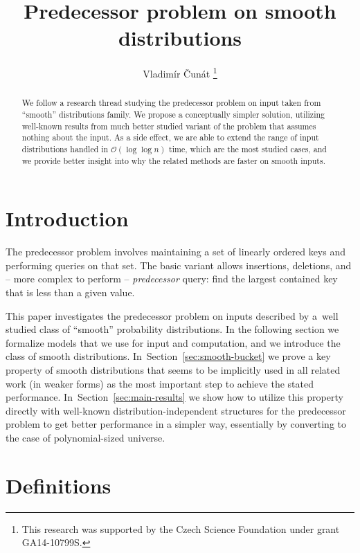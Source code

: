 \documentclass[
submission
]{dmtcs-episciences}
\title{Predecessor problem on smooth distributions}
\affiliation{
  Faculty of Mathematics and Physics, Charles University in Prague, Czech Republic \\
  CZ.NIC, z.\,s.\,p.\,o.
}
\author{Vladim\'ir \v{C}un\'at\affiliationmark{1,2}%
  \thanks{This research was supported by the Czech Science Foundation under grant GA14-10799S.}
}
\theoremstyle{plain}
\theoremstyle{definition}
\theoremstyle{remark}
\theoremstyle{plain}
\theoremstyle{plain}
\def\OO{\mathcal O}
\begin{document}
\maketitle

\begin{abstract}
We follow a research thread studying the predecessor problem on input
taken from ``smooth'' distributions family. We propose a conceptually
simpler solution, utilizing well-known results from much better studied
variant of the problem that assumes nothing about the input. As a
side effect, we are able to extend the range of input distributions
handled in $\OO\left(\log\log n\right)$ time, which are the most
studied cases, and we provide better insight into why the related
methods are faster on smooth inputs.
\end{abstract}




\section{Introduction}

The predecessor problem involves maintaining a set of linearly
ordered keys and performing queries on that set. The basic variant allows insertions, deletions, and -- more complex to perform -- \emph{predecessor} query: find the largest contained key that is less than a given value. 

This paper investigates the predecessor problem on inputs described by  a~well studied class of ``smooth'' probability distributions.
In the following section we formalize models that we use for input and computation,
and we introduce the class of smooth distributions. In~Section~\ref{sec:smooth-bucket} we
prove a key property of smooth distributions that seems to be
implicitly used in all related work (in weaker forms) as the most
important step to achieve the stated performance. In~Section~\ref{sec:main-results}
we show how to utilize this property directly with well-known distribution-independent
structures for the predecessor problem to get better performance in
a simpler way, essentially by converting to the case of polynomial-sized
universe.

\section{Definitions \label{sec:defs}}
\end{document}
